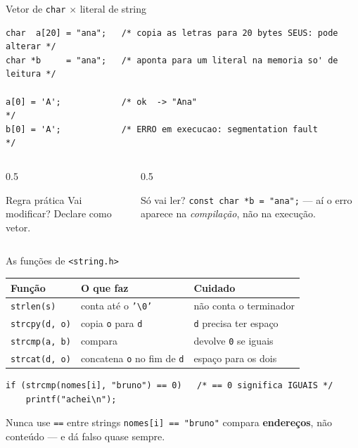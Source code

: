 \documentclass[aspectratio=169]{beamer}
\begin{document}
\begin{frame}[fragile]{Vetor de \texttt{char} $\times$ literal de string}
\begin{lstlisting}[numbers=none]
char  a[20] = "ana";   /* copia as letras para 20 bytes SEUS: pode alterar */
char *b     = "ana";   /* aponta para um literal na memoria so' de leitura */

a[0] = 'A';            /* ok  -> "Ana"                                     */
b[0] = 'A';            /* ERRO em execucao: segmentation fault             */
\end{lstlisting}
  \begin{columns}[T]
    \begin{column}{0.5\textwidth}
      \begin{block}{Regra prática}
        Vai modificar? Declare como vetor.
      \end{block}
    \end{column}
    \begin{column}{0.5\textwidth}
      \begin{block}{Só vai ler?}
        \texttt{const char *b = "ana";} --- aí o erro aparece na
        \emph{compilação}, não na execução.
      \end{block}
    \end{column}
  \end{columns}
\end{frame}

\begin{frame}[fragile]{As funções de \texttt{<string.h>}}
  \begin{center}\small
  \begin{tabular}{@{}lll@{}}
    \toprule
    \textbf{Função} & \textbf{O que faz} & \textbf{Cuidado} \\
    \midrule
    \texttt{strlen(s)}      & conta até o \texttt{'\textbackslash 0'}  & não conta o terminador \\
    \texttt{strcpy(d, o)}   & copia \texttt{o} para \texttt{d}         & \texttt{d} precisa ter espaço \\
    \texttt{strcmp(a, b)}   & compara                                  & devolve \texttt{0} se iguais \\
    \texttt{strcat(d, o)}   & concatena \texttt{o} no fim de \texttt{d} & espaço para os dois \\
    \bottomrule
  \end{tabular}
  \end{center}
\begin{lstlisting}[numbers=none]
if (strcmp(nomes[i], "bruno") == 0)   /* == 0 significa IGUAIS */
    printf("achei\n");
\end{lstlisting}
  \begin{alertblock}{Nunca use \texttt{==} entre strings}
    \texttt{nomes[i] == "bruno"} compara \textbf{endereços}, não conteúdo --- e
    dá falso quase sempre.
  \end{alertblock}
\end{frame}
\end{document}
